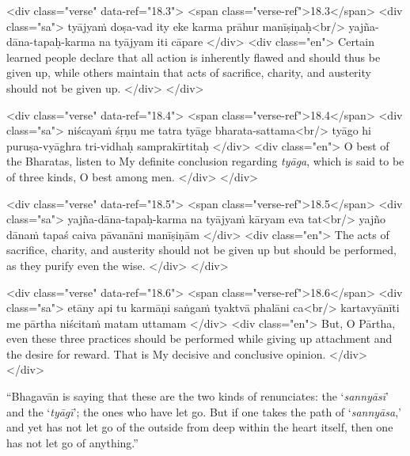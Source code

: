 \begin{html}
<div class="verse" data-ref="18.3">
  <span class="verse-ref">18.3</span>
  <div class="sa">
    tyājyaṁ doṣa-vad ity eke karma prāhur manīṣiṇaḥ<br/>
    yajña-dāna-tapaḥ-karma na tyājyam iti cāpare
  </div>
  <div class="en">
    Certain learned people declare that all action is inherently flawed and should thus be given up, while others maintain that acts of sacrifice, charity, and austerity should not be given up.
  </div>
</div>
\end{html}



\begin{html}
<div class="verse" data-ref="18.4">
  <span class="verse-ref">18.4</span>
  <div class="sa">
    niścayaṁ śṛṇu me tatra tyāge bharata-sattama<br/>
    tyāgo hi puruṣa-vyāghra tri-vidhaḥ samprakīrtitaḥ
  </div>
  <div class="en">
    O best of the Bharatas, listen to My definite conclusion regarding \textit{tyāga}, which is said to be of three kinds, O best among men.
  </div>
</div>
\end{html}



\begin{html}
<div class="verse" data-ref="18.5">
  <span class="verse-ref">18.5</span>
  <div class="sa">
    yajña-dāna-tapaḥ-karma na tyājyaṁ kāryam eva tat<br/>
    yajño dānaṁ tapaś caiva pāvanāni manīṣiṇām
  </div>
  <div class="en">
    The acts of sacrifice, charity, and austerity should not be given up but should be performed, as they purify even the wise.
  </div>
</div>
\end{html}



\begin{html}
<div class="verse" data-ref="18.6">
  <span class="verse-ref">18.6</span>
  <div class="sa">
    etāny api tu karmāṇi saṅgaṁ tyaktvā phalāni ca<br/>
    kartavyānīti me pārtha niścitaṁ matam uttamam
  </div>
  <div class="en">
    But, O Pārtha, even these three practices should be performed while giving up attachment and the desire for reward. That is My decisive and conclusive opinion.
  </div>
</div>
\end{html}


\enquote{Bhagavān is saying that these are the two kinds of renunciates: the \enquote{\textit{sannyāsī}} and the \enquote{\textit{tyāgī}}; the ones who have let go. But if one takes the path of \enquote{\textit{sannyāsa},} and yet has not let go of the outside from deep within the heart itself, then one has not let go of anything.}

